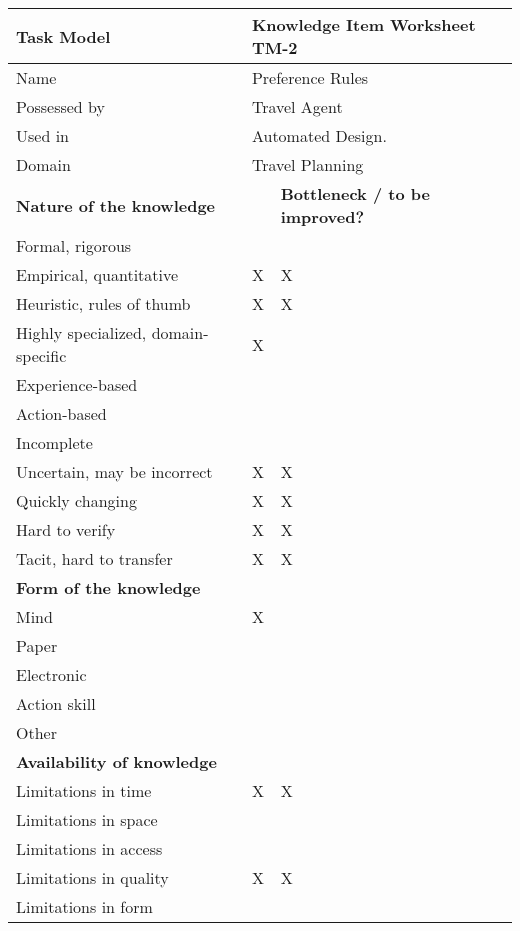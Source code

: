 \begin{tabular}%
       {|p{3cm}%
        |p{2cm}%
        |p{4.2cm}|}
\hline
{\bf Task Model} &
\multicolumn{2}{|l|}{ {\bf Knowledge Item Worksheet TM-2} } \\
\hline
\hline
\sc Name & \multicolumn{2}{|l|}{{\rm Preference Rules} } \\
\sc Possessed by & \multicolumn{2}{|l|}{{\rm Travel Agent} } \\
\sc Used in & \multicolumn{2}{|l|}{{\rm Automated Design.} } \\
\sc Domain & \multicolumn{2}{|l|}{{\rm Travel Planning}}\\
\hline
\hline
\multicolumn{2}{|l|}{ {\bf Nature of the knowledge} }
 & {\bf Bottleneck / to be improved?} \\
\hline
Formal, rigorous & & \\
\hline
Empirical, quantitative & X & X\\
\hline
Heuristic, rules of thumb & X & X\\
\hline
Highly specialized, domain-specific & X & \\
\hline
Experience-based & & \\
\hline
Action-based & & \\
\hline
Incomplete  & & \\
\hline
Uncertain, may be incorrect & X & X\\
\hline
Quickly changing & X & X\\
\hline
Hard to verify & X & X\\
\hline
Tacit, hard to transfer & X & X\\
\hline
\hline
\multicolumn{3}{|l|}{ {\bf Form of the knowledge} } \\
\hline
Mind & X & \\
\hline
Paper & & \\
\hline
Electronic & & \\
\hline
Action skill & & \\
\hline
Other & & \\
\hline
\hline
\multicolumn{3}{|l|}{ {\bf Availability of knowledge} } \\
\hline
Limitations in time  & X & X\\
\hline
Limitations in space & & \\
\hline
Limitations in access & & \\
\hline
Limitations in quality & X & X\\
\hline
Limitations in form & & \\
\hline
\end{tabular}

